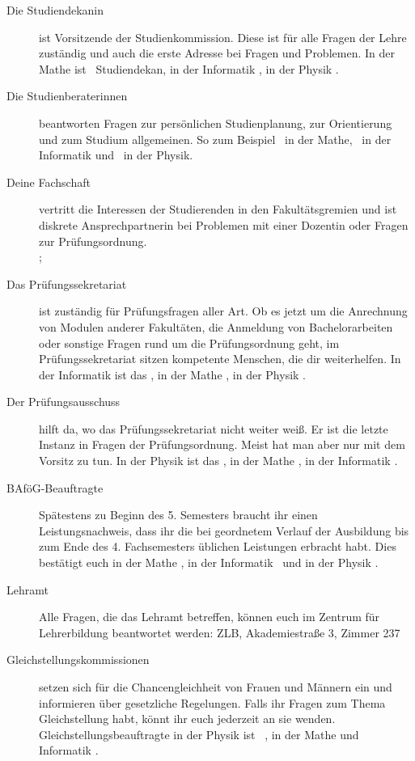 \begin{description}
\item[Die Studiendekanin] ist Vorsitzende der Studienkommission. Diese ist für alle Fragen der Lehre zuständig und auch die erste Adresse bei Fragen und Problemen. In der Mathe ist \studiendekanmathe\ Studiendekan, in der Informatik \studiendekaninformatik , in der Physik \studiendekanphysik .

\item[Die Studienberaterinnen] beantworten Fragen zur persönlichen Studienplanung, zur Orientierung und zum Studium allgemeinen. So zum Beispiel \studienberatungmathe\ in der Mathe, \studienberatunginformatik\ in der Informatik und \studienberatungphysik\ in der Physik.

\item[Deine Fachschaft] vertritt die Interessen der Studierenden in den Fakultätsgremien und ist diskrete Ansprechpartnerin bei Problemen mit einer Dozentin oder Fragen zur Prüfungsordnung. \\\fsraum; 

\item[Das Prüfungssekretariat] ist zuständig für Prüfungsfragen aller Art. Ob es jetzt um die Anrechnung von Modulen anderer Fakultäten, die Anmeldung von Bachelorarbeiten oder sonstige Fragen rund um die Prüfungsordnung geht, im Prüfungssekretariat sitzen kompetente Menschen, die dir weiterhelfen. In der Informatik ist das \pruefsekinfo, in der Mathe \pruefsekmathe, in der Physik \pruefsekphysik.

\item[Der Prüfungsausschuss] hilft da, wo das Prüfungssekretariat nicht weiter weiß. Er ist die letzte Instanz in Fragen der Prüfungsordnung. Meist hat man aber nur mit dem Vorsitz zu tun. In der Physik ist das \pruefausschussvorsitzphysik, in der Mathe \pruefausschussvorsitzmathe, in der Informatik \pruefausschussvorsitzinformatik.

\item[BAföG-Beauftragte] Spätestens zu Beginn des 5. Semesters braucht ihr einen Leistungsnachweis, dass ihr die bei geordnetem Verlauf der Ausbildung bis zum Ende des 4. Fachsemesters üblichen Leistungen erbracht habt. Dies bestätigt euch in der Mathe \bafogmathe , in der Informatik \bafoginformatik\ und in der Physik \bafogphysik .

\item[Lehramt] Alle Fragen, die das Lehramt betreffen, können euch im Zentrum für Lehrerbildung beantwortet werden: ZLB, Akademiestraße 3, Zimmer 237

\item[Gleichstellungskommissionen] setzen sich für die Chancengleichheit von Frauen und Männern ein und informieren über gesetzliche Regelungen. Falls ihr Fragen zum Thema Gleichstellung habt, könnt ihr euch jederzeit an sie wenden. Gleichstellungsbeauftragte in der Physik ist \gleichstellungsbeauftragtephysik\ , in der Mathe und Informatik \gleichstellungsbeauftragtemathe.

\end{description}

